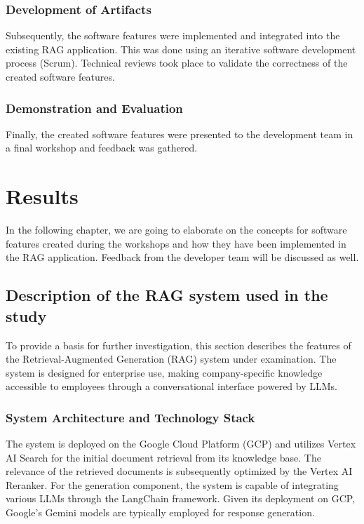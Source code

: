 \documentclass[
	english,
	ruledheaders=section,%
	class=report,%
	thesis={type=bachelor},%
	accentcolor=1b,%
	custommargins=true,%
	marginpar=false,%
	parskip=half-,%
	fontsize=11pt,%
	DIV=14,
]{tudapub}
\begin{document}
\subsection{Development of Artifacts}
Subsequently, the software features were implemented and integrated into the existing RAG application. This was done using an iterative software development process (Scrum). Technical reviews took place to validate the correctness of the created software features.
\subsection{Demonstration and Evaluation}
Finally, the created software features were presented to the development team in a final workshop and feedback was gathered.
\chapter{Results}
In the following chapter, we are going to elaborate on the concepts for software features created during the workshops and how they have been implemented in the RAG application. Feedback from the developer team will be discussed as well.
\section{Description of the RAG system used in the study}
To provide a basis for further investigation, this section describes the features of the Retrieval-Augmented Generation (RAG) system under examination. The system is designed for enterprise use, making company-specific knowledge accessible to employees through a conversational interface powered by LLMs.

\subsection{System Architecture and Technology Stack}
The system is deployed on the Google Cloud Platform (GCP) and utilizes Vertex AI Search for the initial document retrieval from its knowledge base. The relevance of the retrieved documents is subsequently optimized by the Vertex AI Reranker. For the generation component, the system is capable of integrating various LLMs through the LangChain framework. Given its deployment on GCP, Google's Gemini models are typically employed for response generation.
\end{document}

